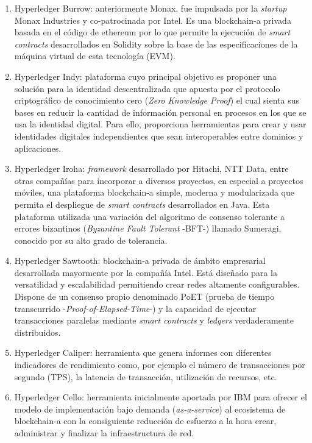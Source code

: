 \documentclass[12pt,a4paper, twoside]{report}
\begin{document}
	\begin{enumerate}
		\item Hyperledger Burrow: anteriormente Monax, fue impulsada por la \textit{startup} Monax Industries y co-patrocinada por Intel. Es una \gls{blockchain-a} privada basada en el código de \gls{ethereum} por lo que permite la ejecución de \textit{smart contracts} desarrollados en Solidity sobre la base de las especificaciones de la máquina virtual de esta tecnología (EVM).
				
		\item Hyperledger Indy: plataforma cuyo principal objetivo es proponer una solución para la identidad descentralizada que apuesta por el protocolo criptográfico de conocimiento cero (\textit{Zero Knowledge Proof}) el cual sienta sus bases en reducir la cantidad de información personal en procesos en los que se usa la identidad digital. Para ello, proporciona herramientas para crear y usar identidades digitales independientes que sean interoperables entre dominios y aplicaciones.
		
		\item Hyperledger Iroha: \textit{\gls{framework}} desarrollado por Hitachi, NTT Data, entre otras compañías para incorporar a diversos proyectos, en especial a proyectos móviles, una plataforma \gls{blockchain-a} simple, moderna y modularizada que permita el despliegue de \textit{smart contracts} desarrollados en Java. Esta plataforma utilizada una variación del algoritmo de consenso tolerante a errores bizantinos (\textit{Byzantine Fault Tolerant} -BFT-) llamado Sumeragi, conocido por su alto grado de tolerancia.
				 
		\item Hyperledger Sawtooth: \gls{blockchain-a} privada de ámbito empresarial desarrollada mayormente por la compañía Intel. Está diseñado para la versatilidad y escalabilidad permitiendo crear redes altamente configurables. Dispone de un consenso propio denominado PoET (prueba de tiempo transcurrido -\textit{Proof-of-Elapsed-Time}-) y la capacidad de ejecutar transacciones paralelas mediante \textit{smart contracts} y \textit{ledgers} verdaderamente distribuidos.
		
		\item Hyperledger Caliper: herramienta que genera informes con diferentes indicadores de rendimiento como, por ejemplo el número de transacciones por segundo (TPS), la latencia de transacción, utilización de recursos, etc.
		
		\item Hyperledger Cello: herramienta inicialmente aportada por IBM para ofrecer el modelo de implementación bajo demanda (\textit{as-a-service}) al ecosistema de \gls{blockchain-a} con la consiguiente reducción de esfuerzo a la hora crear, administrar y finalizar la infraestructura de red.
				

\end{enumerate}
\end{document}
